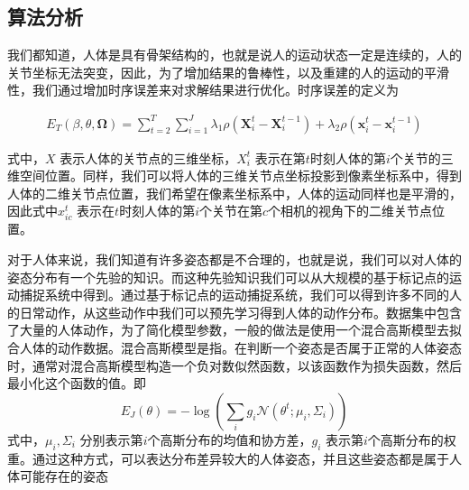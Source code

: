 \subsection{算法分析}

我们都知道，人体是具有骨架结构的，也就是说人的运动状态一定是连续的，人的关节坐标无法突变，因此，为了增加结果的鲁棒性，以及重建的人的运动的平滑性，我们通过增加时序误差来对求解结果进行优化。时序误差的定义为

\begin{align} 
    E _ { T } ( \beta , \theta , \mathbf { \Omega } ) = \sum _ { t = 2 } ^ { T } \sum _ { i = 1 } ^ { J } \lambda _ { 1 } \rho \left( \mathbf { X } _ { i } ^ { t } - \mathbf { X } _ { i } ^ { t - 1 } \right) + \lambda _ { 2 } \rho \left( \mathbf { x } _ { i } ^ { t } - \mathbf { x } _ { i } ^ { t - 1 } \right)
\end{align}

式中，$X$ 表示人体的关节点的三维坐标，$X_i^t$ 表示在第$t$时刻人体的第$i$个关节的三维空间位置。同样，我们可以将人体的三维关节点坐标投影到像素坐标系中，得到人体的二维关节点位置，我们希望在像素坐标系中，人体的运动同样也是平滑的，因此式中$x_{ic}^t$ 表示在$t$时刻人体的第$i$个关节在第$c$个相机的视角下的二维关节点位置。

对于人体来说，我们知道有许多姿态都是不合理的，也就是说，我们可以对人体的姿态分布有一个先验的知识。而这种先验知识我们可以从大规模的基于标记点的运动捕捉系统中得到。通过基于标记点的运动捕捉系统，我们可以得到许多不同的人的日常动作，从这些动作中我们可以预先学习得到人体的动作分布。\cite{mocap}数据集中包含了大量的人体动作，为了简化模型参数，一般的做法是使用一个混合高斯模型去\cite{我也不知道哪篇}拟合人体的动作数据。混合高斯模型是指。在判断一个姿态是否属于正常的人体姿态时，通常对混合高斯模型构造一个负对数似然函数，以该函数作为损失函数，然后最小化这个函数的值。即
$$
    E _ { J } ( \theta ) = - \log \left( \sum _ { i } g _ { i } \mathcal { N } \left( \theta ^ { t } ; \mu _ { i } , \Sigma _ { i } \right) \right)
$$
式中，$\mu_i, \Sigma_i$ 分别表示第$i$个高斯分布的均值和协方差，$g_i$ 表示第$i$个高斯分布的权重。通过这种方式，可以表达分布差异较大的人体姿态，并且这些姿态都是属于人体可能存在的姿态